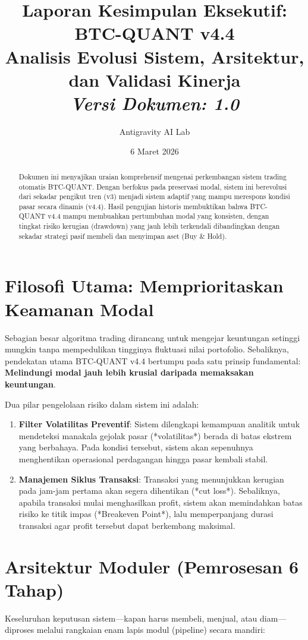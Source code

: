 \documentclass[a4paper,11pt]{article}
\title{
    \vspace{-2cm}
    \large \textbf{Laporan Kesimpulan Eksekutif: BTC-QUANT v4.4} \\
    \Large Analisis Evolusi Sistem, Arsitektur, dan Validasi Kinerja \\
    \vspace{5pt}
    \small \textit{Versi Dokumen: 1.0}
}
\author{Antigravity AI Lab}
\date{6 Maret 2026}
\begin{document}
\maketitle

\begin{abstract}
Dokumen ini menyajikan uraian komprehensif mengenai perkembangan sistem trading otomatis BTC-QUANT. Dengan berfokus pada preservasi modal, sistem ini berevolusi dari sekadar pengikut tren (v3) menjadi sistem adaptif yang mampu merespons kondisi pasar secara dinamis (v4.4). Hasil pengujian historis membuktikan bahwa BTC-QUANT v4.4 mampu membuahkan pertumbuhan modal yang konsisten, dengan tingkat risiko kerugian (drawdown) yang jauh lebih terkendali dibandingkan dengan sekadar strategi pasif membeli dan menyimpan aset (Buy \& Hold).
\end{abstract}

\section{Filosofi Utama: Memprioritaskan Keamanan Modal}
Sebagian besar algoritma trading dirancang untuk mengejar keuntungan setinggi mungkin tanpa mempedulikan tingginya fluktuasi nilai portofolio. Sebaliknya, pendekatan utama BTC-QUANT v4.4 bertumpu pada satu prinsip fundamental: \textbf{Melindungi modal jauh lebih krusial daripada memaksakan keuntungan}.

Dua pilar pengelolaan risiko dalam sistem ini adalah:
\begin{enumerate}
    \item \textbf{Filter Volatilitas Preventif}: Sistem dilengkapi kemampuan analitik untuk mendeteksi manakala gejolak pasar (*volatilitas*) berada di batas ekstrem yang berbahaya. Pada kondisi tersebut, sistem akan sepenuhnya menghentikan operasional perdagangan hingga pasar kembali stabil.
    \item \textbf{Manajemen Siklus Transaksi}: Transaksi yang menunjukkan kerugian pada jam-jam pertama akan segera dihentikan (*cut loss*). Sebaliknya, apabila transaksi mulai menghasilkan profit, sistem akan memindahkan batas risiko ke titik impas (*Breakeven Point*), lalu memperpanjang durasi transaksi agar profit tersebut dapat berkembang maksimal.
\end{enumerate}

\section{Arsitektur Moduler (Pemrosesan 6 Tahap)}
Keseluruhan keputusan sistem—kapan harus membeli, menjual, atau diam—diproses melalui rangkaian enam lapis modul (pipeline) secara mandiri:
\end{document}
